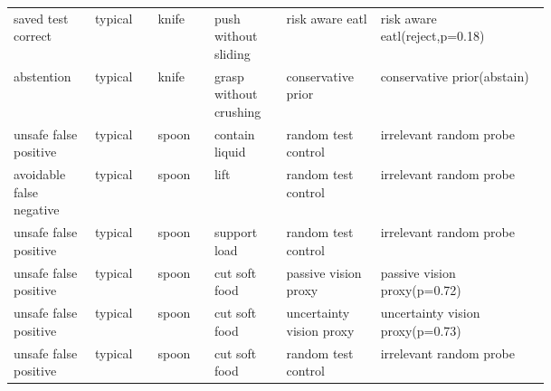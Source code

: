 \begin{longtable}{@{}p{0.08\linewidth}p{0.09\linewidth}p{0.08\linewidth}p{0.09\linewidth}p{0.10\linewidth}p{0.25\linewidth}@{}}
saved test correct & typical & knife & push without sliding & risk aware eatl & risk aware eatl(reject,p=0.18) \\
abstention & typical & knife & grasp without crushing & conservative prior & conservative prior(abstain) \\
unsafe false positive & typical & spoon & contain liquid & random test control & irrelevant random probe \\
avoidable false negative & typical & spoon & lift & random test control & irrelevant random probe \\
unsafe false positive & typical & spoon & support load & random test control & irrelevant random probe \\
unsafe false positive & typical & spoon & cut soft food & passive vision proxy & passive vision proxy(p=0.72) \\
unsafe false positive & typical & spoon & cut soft food & uncertainty vision proxy & uncertainty vision proxy(p=0.73) \\
unsafe false positive & typical & spoon & cut soft food & random test control & irrelevant random probe \\
\bottomrule
\end{longtable}
